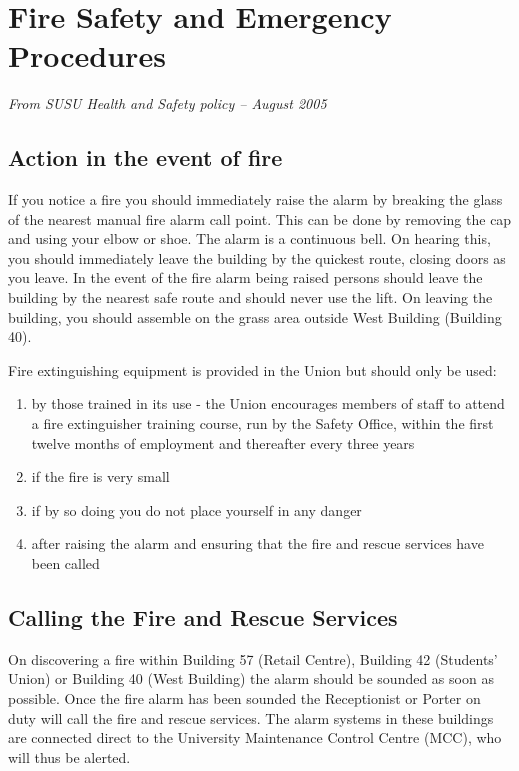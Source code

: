 \documentclass[12pt,a4paper]{scrartcl}
\begin{document}


\clearpage
\appendix
\section{Fire Safety and Emergency Procedures}
\textit{From SUSU Health and Safety policy -- August 2005}

\subsection{Action in the event of fire}
If you notice a fire you should immediately raise the alarm by breaking the glass of the nearest manual fire alarm call point. This can be done by removing the cap and using your elbow or shoe. The alarm is a continuous bell. On hearing this, you should immediately leave the building by the quickest route, closing doors as you leave. In the event of the fire alarm being raised persons should leave the building by the nearest safe route and should never use the lift. On leaving the building, you should assemble on the grass area outside West Building (Building 40).

Fire extinguishing equipment is provided in the Union but should only be used:
\begin{enumerate}
\item by those trained in its use - the Union encourages members of staff to attend a fire extinguisher training course, run by the Safety Office, within the first twelve months of employment and thereafter every three years
\item if the fire is very small
\item if by so doing you do not place yourself in any danger
\item after raising the alarm and ensuring that the fire and rescue services have been called
\end{enumerate}


\subsection{Calling the Fire and Rescue Services}
On discovering a fire within Building 57 (Retail Centre), Building 42 (Students’ Union) or
Building 40 (West Building) the alarm should be sounded as soon as possible. Once the
fire alarm has been sounded the Receptionist or Porter on duty will call the fire and
rescue services. The alarm systems in these buildings are connected direct to the
University Maintenance Control Centre (MCC), who will thus be alerted.
\end{document}
